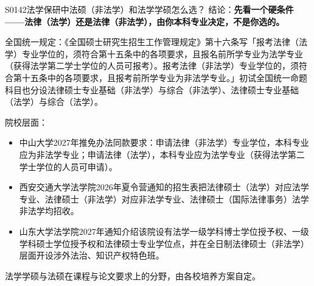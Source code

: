 \begin{qa}{S0142}{法学保研中法硕（非法学）和法学学硕怎么选？}
结论：\textbf{先看一个硬条件——法律（法学）还是法律（非法学），由你本科专业决定，不是你选的。}

全国统一规定：《全国硕士研究生招生工作管理规定》第十六条写「报考法律（法学）专业学位的，须符合第十五条中的各项要求，且报名前所学专业为法学专业（获得法学第二学士学位的人员可报考）。报考法律（非法学）专业学位的，须符合第十五条中的各项要求，且报考前所学专业为非法学专业。」初试全国统一命题科目也分设法律硕士专业基础（非法学）与综合（非法学）、法律硕士专业基础（法学）与综合（法学）。

院校层面：
\begin{itemize}
  \item 中山大学2027年推免办法同款要求：申请法律（非法学）专业学位，本科专业应为非法学专业；申请法律（法学），本科专业应为法学专业（获得法学第二学士学位的人员可申请）。
  \item 西安交通大学法学院2026年夏令营通知的招生表把法律硕士（法学）对应法学专业、法律硕士（非法学）对应非法学专业、法律硕士（国际法律事务）法学非法学均招收。
  \item 山东大学法学院2027年通知介绍该院设有法学一级学科博士学位授予权、一级学科硕士学位授予权和法律硕士专业学位点，并在全日制法律硕士（非法学）层面开设涉外法治、知识产权特色班。
\end{itemize}

法学学硕与法硕在课程与论文要求上的分野，由各校培养方案自定。
\end{qa}

